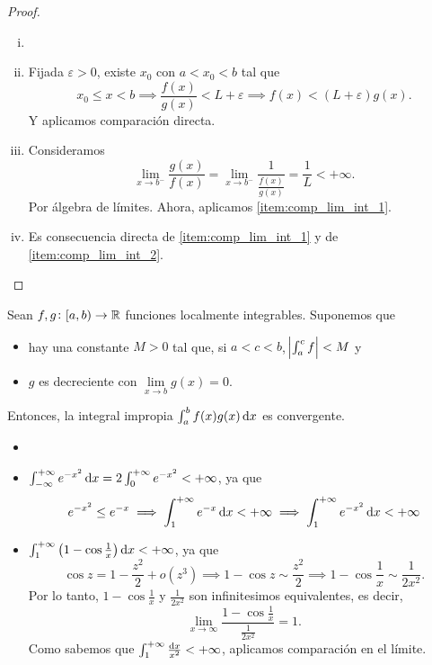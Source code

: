 \begin{proof}
    \begin{enumerate}[i)]
        \item[]
        \item Fijada $\varepsilon > 0$, existe $x_0$ con $a < x_0 < b$ tal que
            \[
                x_0 \leq x < b \implies \frac{f(x)}{g(x)} < L +
                \varepsilon \implies f(x) < (L+\varepsilon)g(x).
            \]
            Y aplicamos comparación directa.
        \item Consideramos
            \[
                \lim_{x \to b^-} \frac{g(x)}{f(x)} = \lim_{x \to b^-}
                \frac{1}{\frac{f(x)}{g(x)}} = \frac{1}{L} < +\infty.
            \]
            Por álgebra de límites. Ahora, aplicamos
            \ref{item:comp_lim_int_1}.
        \item Es consecuencia directa de \ref{item:comp_lim_int_1} y de
            \ref{item:comp_lim_int_2}.
    \end{enumerate}
\end{proof}

\begin{prop}
    Sean $f,g \colon [a,b) \to \mathbb{R}$ funciones localmente integrables. Suponemos
    que
    \begin{itemize}
        \item hay una constante $M > 0$ tal que, si $a < c < b$,
            $\abs{\int^c_a f} < M$ y
        \item $g$ es decreciente con $\lim\limits_{x \to b} g(x) = 0$.
    \end{itemize}
    Entonces, la integral impropia $\int^b_a f(x)g(x)\dif x$ es convergente.
\end{prop}

\begin{example*}
    \begin{itemize}
        \item[]
        \item $\int^{+\infty}_{-\infty} e^{-x^2} \dif x = 2
                \int^{+\infty}_0 e^{-x^2} < +\infty$, ya que 
            \[
                e^{-x^2} \leq e^{-x} \implies \int^{+\infty}_1 e^{-x}
                \dif x < +\infty \implies \int^{+\infty}_1 e^{-x^2}
                \dif x < +\infty
            \]
        \item $\int^{+\infty}_1 \left( 1 - \cos \frac{1}{x} \right)
                \dif x < +\infty$, ya que
            \[
                \cos z = 1 - \frac{z^2}{2} + o(z^3) \implies
                1-\cos z \sim \frac{z^2}{2} \implies
                1-\cos \frac{1}{x} \sim \frac{1}{2x^2}.
            \]
            Por lo tanto, $1-\cos \frac{1}{x}$ y $\frac{1}{2x^2}$ son 
            infinitesimos equivalentes, es decir,
            \[
                \lim_{x \to \infty} \frac{1-\cos \frac{1}{x}}
                {\frac{1}{2x^2}} = 1.
            \]
            Como sabemos que $\huge\int^{+\infty}_1 \frac{\dif x}{x^2} <
            +\infty$, aplicamos comparación en el límite.
    \end{itemize}
\end{example*}

